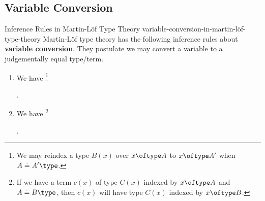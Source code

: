 \subsection{Variable Conversion}\label{subsection-variable-conversion-in-martin-löf-type-theory}
\begin{definition}{Inference Rules in Martin-Löf Type Theory \rmIV}{variable-conversion-in-martin-löf-type-theory}%
    Martin-Löf type theory has the following inference rules about \textbf{variable conversion}. They postulate we may convert a variable to a judgementally equal type/term.%
    \begin{enumerate}
        \item\label{variable-conversion-in-martin-löf-type-theory-variable-conversion-for-types}We have%
            \footnote{%
                We may reindex a type $B(x)$ over $x\oftype A$ to $x\oftype A'$ when $A\doteq A'\type$.
            }%
            \begin{webprooftree}%
                \begin{prooftree}%
                \end{prooftree}%
                .%
            \end{webprooftree}%
        \item\label{variable-conversion-in-martin-löf-type-theory-variable-conversion-for-terms}We have%
            \footnote{%
                If we have a term $c(x)$ of type $C(x)$ indexed by $x\oftype A$ and $A\doteq B\type$, then $c(x)$ will have type $C(x)$ indexed by $x\oftype B$.
            }%
            \begin{webprooftree}%
                \begin{prooftree}%
                \end{prooftree}%
                .%

\end{webprooftree}
\end{enumerate}
\end{definition}
